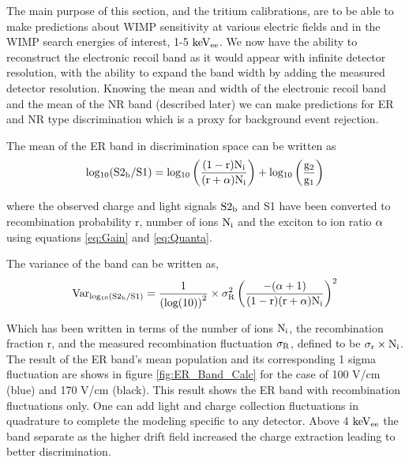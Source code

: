 The main purpose of this section, and the tritium calibrations, are to be able to make predictions about WIMP sensitivity at various electric fields and in the WIMP search energies of interest, 1-5 $\rm keV_{ee}$. We now have the ability to reconstruct the electronic recoil band as it would appear with infinite detector resolution, with the ability to expand the band width by adding the measured detector resolution. Knowing the mean and width of the electronic recoil band and the mean of the NR band (described later) we can make predictions for ER and NR type discrimination which is a proxy for background event rejection.  

The mean of the ER band in discrimination space can be written as
\begin{equation}
\rm log_{10}(S2_b/S1) = log_{10} \left(\frac{(1-r)N_i}{(r+\alpha)N_i}\right) + log_{10}\left(\frac{g_2}{g_1}\right)
\label{eq:Band_Mean}
\end{equation}

\noindent where the observed charge and light signals $\rm S2_b$ and S1 have been converted to recombination probability r,  number of ions $\rm N_i$ and the exciton to ion ratio $\rm \alpha$ using equations \ref{eq:Gain} and \ref{eq:Quanta}.

The variance of the band can be written as,
\begin{equation}
\rm Var_{log_{10}(S2_b/S1)} = \frac{1}{\left(log(10)\right)^2} \times \sigma_R^2 \left( \frac{ - (\alpha+1) }{(1-r)(r+\alpha)N_i} \right)^2
\label{eq:Band_Var}
\end{equation}

\noindent Which has been written in terms of the number of ions $\rm N_i$, the recombination fraction r, and the measured recombination fluctuation $\rm \sigma_R$, defined to be $\rm \sigma_r\times N_i$. The result of the ER band's mean population and its corresponding 1 sigma fluctuation are shows in figure \ref{fig:ER_Band_Calc} for the case of 100 V/cm (blue) and 170 V/cm (black). This result shows the ER band with recombination fluctuations only. One can add light and charge collection fluctuations in quadrature to complete the modeling specific to any detector. Above 4 $\rm keV_{ee}$ the band separate as the higher drift field increased the charge extraction leading to better discrimination.

